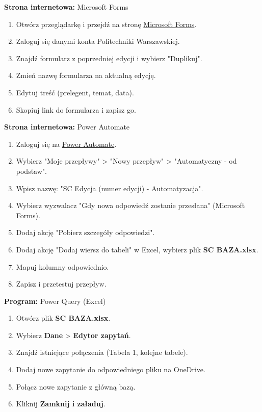 \textbf{Strona internetowa:} Microsoft Forms
\begin{enumerate}
    \item Otwórz przeglądarkę i przejdź na stronę \href{https://forms.office.com}{Microsoft Forms}.
    \item Zaloguj się danymi konta Politechniki Warszawskiej.
    \item Znajdź formularz z poprzedniej edycji i wybierz "Duplikuj".
    \item Zmień nazwę formularza na aktualną edycję.
    \item Edytuj treść (prelegent, temat, data).
    \item Skopiuj link do formularza i zapisz go.
\end{enumerate}

\textbf{Strona internetowa:} Power Automate
\begin{enumerate}
    \item Zaloguj się na \href{https://flow.microsoft.com}{Power Automate}.
    \item Wybierz "Moje przepływy" > "Nowy przepływ" > "Automatyczny - od podstaw".
    \item Wpisz nazwę: "SC Edycja (numer edycji) - Automatyzacja".
    \item Wybierz wyzwalacz "Gdy nowa odpowiedź zostanie przesłana" (Microsoft Forms).
    \item Dodaj akcję "Pobierz szczegóły odpowiedzi".
    \item Dodaj akcję "Dodaj wiersz do tabeli" w Excel, wybierz plik \textbf{SC BAZA.xlsx}.
    \item Mapuj kolumny odpowiednio.
    \item Zapisz i przetestuj przepływ.
\end{enumerate}

\textbf{Program:} Power Query (Excel)
\begin{enumerate}
    \item Otwórz plik \textbf{SC BAZA.xlsx}.
    \item Wybierz \textbf{Dane} > \textbf{Edytor zapytań}.
    \item Znajdź istniejące połączenia (Tabela 1, kolejne tabele).
    \item Dodaj nowe zapytanie do odpowiedniego pliku na OneDrive.
    \item Połącz nowe zapytanie z główną bazą.
    \item Kliknij \textbf{Zamknij i załaduj}.
\end{enumerate}

